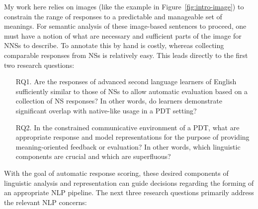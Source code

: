 My work here relies on images (like the example in Figure~\ref{fig:intro-image}) to constrain the range of responses to a predictable and manageable set of meanings. For semantic analysis of these image-based sentences to proceed, one must have a notion of what are necessary and sufficient parts of the image for NNSs to describe. To annotate this by hand is costly, whereas collecting comparable responses from NSs is relatively easy. This leads directly to the first two research questions:

\begin{itemize}

\item[RQ1.]{Are the responses of advanced second language learners of English sufficiently similar to those of NSs to allow automatic evaluation based on a collection of NS responses? In other words, do learners demonstrate significant overlap with native-like usage in a PDT setting?} %
\end{itemize}

\begin{itemize}
\item[RQ2.]{In the constrained communicative environment of a PDT, what are appropriate response and model representations for the purpose of providing meaning-oriented feedback or evaluation? In other words, which linguistic components are crucial and which are superfluous?}
\end{itemize}

With the goal of automatic response scoring, these desired components of linguistic analysis and representation can guide decisions regarding the forming of an appropriate NLP pipeline. The next three research questions primarily address the relevant NLP concerns:

